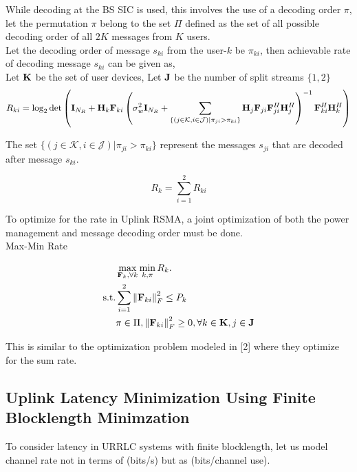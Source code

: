 \documentclass[a4paper, 12pt, onecolumn, journal, twoside, draftclsnofoot]{IEEEtran}
\begin{document}
While decoding at the BS SIC is used, this involves the use of a decoding order $\pi$, let the permutation $\pi$ belong to the set $\Pi$ defined as the set of all possible decoding order of all $2K$ messages from $K$ users. \\


Let the decoding order of message $s_{ki}$ from the user-$k$ be $\pi_{ki}$, then achievable rate of decoding message $s_{ki}$ can be given as, \\
Let ${\bf K}$ be the set of user devices, Let ${\bf J}$ be the number of split streams $\{1,2\}$
\begin{equation*}
	R_{ki} = \log_2 \det \left(  {\bf I}_{N_R}  +  {\bf H}_k {\bf F}_{ki}     \left(  \sigma_w^2 {\bf I}_{N_R}  + \sum_{\{(j{\in}\mathcal{K},i{\in}\mathcal{J})|\pi_{ji}{>}\pi_{ki}\}}  {\bf H}_j {\bf F}_{ji} {\bf F}_{ji}^H {\bf H}_j^H  \right)^{-1}     {\bf F}_{ki}^H {\bf H}_k^H  \right) 
\end{equation*}

The set $\{(j{\in}\mathcal{K},i{\in}\mathcal{J})|\pi_{ji}{>}\pi_{ki}\}$ represent the messages $s_{ji}$ that are decoded after  message $s_{ki}$.

\begin{equation*}
    R_k = \sum^2_{i=1} R_{ki}
\end{equation*}

To optimize for the rate in Uplink RSMA, a joint optimization of both the power management and message decoding order must be done. \\

Max-Min Rate


\begin{equation*}
    \begin{split}
    &\max_{{\bf F}_k, \forall k}  \min_{k, \pi}  R_k.  \\
    \mathrm{s.t.} 
    &\sum_{i=1}^2 \left\| {\bf F}_{ki} \right\|_F^2  \leq P_k \\
    &\pi \in \Pi, \left\| {\bf F}_{ki} \right\|_F^2 \geq  0, \forall k \in {\bf K}, j \in {\bf J} 
    \end{split}
\end{equation*}

This is similar to the optimization problem modeled in [2] where they optimize for the sum rate.


\subsection{Uplink Latency Minimization Using Finite Blocklength Minimzation}

To consider latency in URRLC systems with finite blocklength, let us model channel rate not in terms of (bits/s) but as (bits/channel use). \\
\end{document}
